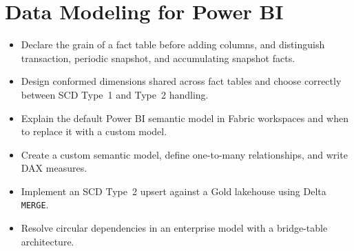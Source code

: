 \chapter{Data Modeling for Power BI}
%

\begin{objectives}
\begin{itemize}
    \item Declare the grain of a fact table before adding columns, and distinguish transaction, periodic snapshot, and accumulating snapshot facts.
    \item Design conformed dimensions shared across fact tables and choose correctly between SCD Type~1 and Type~2 handling.
    \item Explain the default Power BI semantic model in Fabric workspaces and when to replace it with a custom model.
    \item Create a custom semantic model, define one-to-many relationships, and write DAX measures.
    \item Implement an SCD Type~2 upsert against a Gold lakehouse using Delta \texttt{MERGE}.
    \item Resolve circular dependencies in an enterprise model with a bridge-table architecture.
\end{itemize}
\end{objectives}

